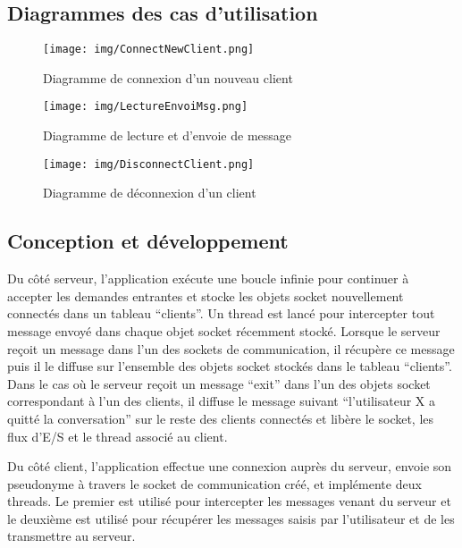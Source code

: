 \documentclass[
]{article}
\begin{document}
\hypertarget{diagrammes-des-cas-dutilisation}{%
\subsection{Diagrammes des cas
d'utilisation}\label{diagrammes-des-cas-dutilisation}}

\begin{figure}[H]
\centering
\texttt{[image: img/ConnectNewClient.png]}
\caption{Diagramme de connexion d'un nouveau client}
\end{figure}

\begin{center}
  \begin{figure}[H]
    \centering
    \texttt{[image: img/LectureEnvoiMsg.png]}
    \caption{Diagramme de lecture et d'envoie de message}
    \end{figure}
\end{center}

\begin{center}
\begin{figure}[H]
\centering
\texttt{[image: img/DisconnectClient.png]}
\caption{Diagramme de déconnexion d'un client}
\end{figure}
\end{center}
\hypertarget{conception-et-duxe9veloppement}{%
\subsection{Conception et
développement}\label{conception-et-duxe9veloppement}}

Du côté serveur, l'application exécute une boucle infinie pour continuer
à accepter les demandes entrantes et stocke les objets socket
nouvellement connectés dans un tableau ``clients''. Un thread est lancé
pour intercepter tout message envoyé dans chaque objet socket récemment
stocké. Lorsque le serveur reçoit un message dans l'un des sockets de
communication, il récupère ce message puis il le diffuse sur l'ensemble
des objets socket stockés dans le tableau ``clients''. Dans le cas où le
serveur reçoit un message ``exit'' dans l'un des objets socket
correspondant à l'un des clients, il diffuse le message suivant
``l'utilisateur X a quitté la conversation'' sur le reste des clients
connectés et libère le socket, les flux d'E/S et le thread associé au
client.

Du côté client, l'application effectue une connexion auprès du serveur,
envoie son pseudonyme à travers le socket de communication créé, et
implémente deux threads. Le premier est utilisé pour intercepter les
messages venant du serveur et le deuxième est utilisé pour récupérer les
messages saisis par l'utilisateur et de les transmettre au serveur.
\end{document}
